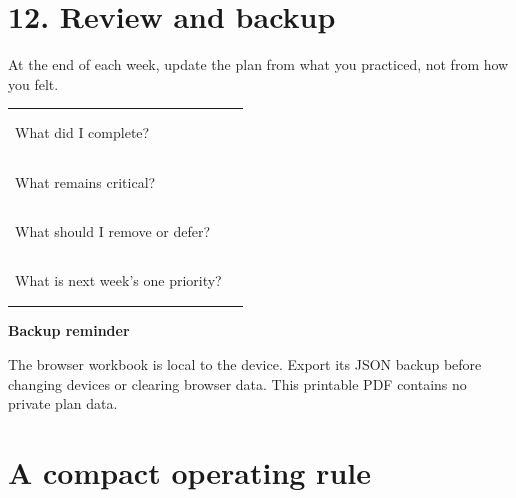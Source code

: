 \documentclass[10pt,letterpaper]{article}
\newcommand{\longline}{\par\noindent\rule{\linewidth}{.35pt}\par\vspace{.35em}}
\newcommand{\sectionrule}{\vspace{.1in}\noindent{\color{rule}\rule{\linewidth}{.5pt}}\vspace{.1in}}
\begin{document}
\newpage
\section*{12. Review and backup}
At the end of each week, update the plan from what you practiced, not from how you felt.
\vspace{.1in}
\begin{tabularx}{\linewidth}{@{}p{.3\linewidth} X@{}}
\toprule
What did I complete? & \longline \longline\\
What remains critical? & \longline \longline\\
What should I remove or defer? & \longline \longline\\
What is next week's one priority? & \longline \longline\\
\bottomrule
\end{tabularx}
\vspace{.15in}
\textbf{Backup reminder}\par
The browser workbook is local to the device. Export its JSON backup before changing devices or clearing browser data. This printable PDF contains no private plan data.

\section*{A compact operating rule}

\vfill
\sectionrule
\end{document}
